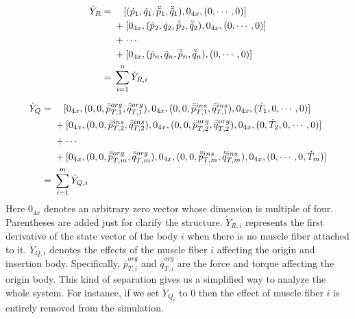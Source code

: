 \documentclass[a4paper,10pt]{article}
\begin{document}
\begin{align}
\dot{Y}_R = {} &  \quad[ (\dot{p}_1, \dot{q}_1, \ddot{\tilde{p}}_1, \ddot{\tilde{q}}_1), 0_{4x}, (0, \cdots , 0)]\notag\\
               & +[ 0_{4x}, (\dot{p}_2, \dot{q}_2, \ddot{\tilde{p}}_2, \ddot{\tilde{q}}_2), 0_{4x}, (0, \cdots , 0)]\notag\\
               & + \cdots\notag\\
               & + [ 0_{4x}, (\dot{p}_n, \dot{q}_n, \ddot{\tilde{p}}_n, \ddot{\tilde{q}}_n), (0, \cdots , 0)]\notag\\
          = {} & \sum_{i=1}^{n}{\dot{Y}_{R,i}}
\end{align}

\begin{align}
\dot{Y}_Q = {} & \quad[ 0_{4x}, (0, 0, \ddot{\bar{p}}_{T,1}^{org}, \ddot{\bar{q}}_{T,1}^{org}),
                   0_{4x}, (0, 0, \ddot{\bar{p}}_{T,1}^{ins}, \ddot{\bar{q}}_{T,1}^{ins}),
                   0_{4x}, (\dot{T}_1, 0, \cdots, 0)]\notag\\
               & + [ 0_{4x}, (0, 0, \ddot{\bar{p}}_{T,2}^{ins}, \ddot{\bar{q}}_{T,2}^{ins}),
                     0_{4x}, (0, 0, \ddot{\bar{p}}_{T,2}^{org}, \ddot{\bar{q}}_{T,2}^{org}),
                     0_{4x}, (0, \dot{T}_2, 0, \cdots, 0)]\notag\\
               & + \cdots\notag\\
               & + [ 0_{4x}, (0, 0, \ddot{\bar{p}}_{T,m}^{org}, \ddot{\bar{q}}_{T,m}^{org}),
                     0_{4x}, (0, 0, \ddot{\bar{p}}_{T,m}^{ins}, \ddot{\bar{q}}_{T,m}^{ins}),
                     0_{4x}, (0, \cdots, 0, \dot{T}_m)]\notag\\
          = {} & \sum_{i=1}^{m}{\dot{Y}_{Q,i}}
\end{align}
Here $0_{4x}$ denotes an arbitrary zero vector whose dimension is multiple of four.
Parentheses are added just for clarify the structure.
$\dot{Y}_{R,i}$ represents the first derivative of the state vector of the body $i$
when there is no muscle fiber attached to it. $\dot{Y}_{Q,i}$ denotes the effects of
the muscle fiber $i$ affecting the origin and insertion body. Specifically,
$ \ddot{\bar{p}}_{T,i}^{org} $ and $ \ddot{\bar{q}}_{T,i}^{org} $ are the force and
torque affecting the origin body. This kind of separation gives us a simplified
way to analyze the whole system. For instance, if we set $\dot{Y}_{Q_i}$ to 0 then
the effect of muscle fiber $i$ is entirely removed from the simulation.

\end{document}
